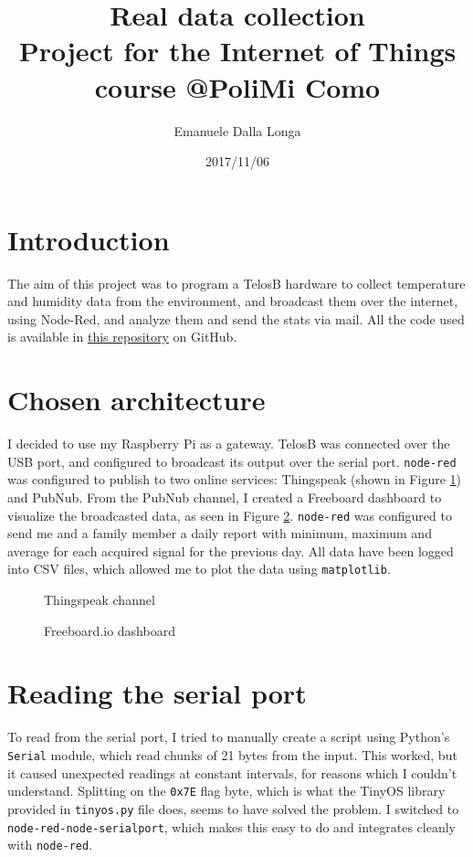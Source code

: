 \documentclass[11pt]{article}
\title{\textbf{Real data collection}\\
				\large Project for the Internet of Things course @PoliMi Como}
\author{Emanuele Dalla Longa}
\date{2017/11/06}
\begin{document}
\maketitle

\section{Introduction}
The aim of this project was to program a TelosB hardware to collect temperature and humidity data from the environment, and broadcast them over the internet, using Node-Red, and analyze them and send the stats via mail. All the code used is available in \href{https://github.com/infinitesnow/IOT2016}{this repository} on GitHub.

\section{Chosen architecture}
I decided to use my Raspberry Pi as a gateway. TelosB was connected over the USB port, and configured to broadcast its output over the serial port. \texttt{node-red} was configured to publish to two online services: Thingspeak (shown in Figure \ref{fig:thingspeak}) and PubNub. From the PubNub channel, I created a Freeboard dashboard to visualize the broadcasted data, as seen in Figure \ref{fig:freeboard}. \texttt{node-red} was configured to send me and a family member a daily report with minimum, maximum and average for each acquired signal for the previous day. All data have been logged into CSV files, which allowed me to plot the data using \texttt{matplotlib}.

\begin{figure}
\caption{Thingspeak channel}
\label{fig:thingspeak}
\end{figure}

\begin{figure}
\caption{Freeboard.io dashboard}
\label{fig:freeboard}
\end{figure}

\section{Reading the serial port}
To read from the serial port, I tried to manually create a script using Python's \texttt{Serial} module, which read chunks of 21 bytes from the input. This worked, but it caused unexpected readings at constant intervals, for reasons which I couldn't understand. Splitting on the \texttt{0x7E} flag byte, which is what the TinyOS library provided in \texttt{tinyos.py} file does, seems to have solved the problem. I switched to \texttt{node-red-node-serialport}, which makes this easy to do and integrates cleanly with \texttt{node-red}.
 
\end{document}
